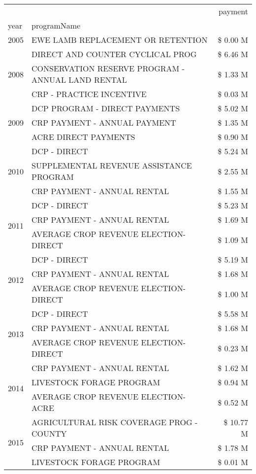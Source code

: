 \begin{tabular}{llr}
\toprule
 &  & payment \\
year & programName &  \\
\midrule
2005 & EWE LAMB REPLACEMENT OR RETENTION & \$ 0.00 M \\
\cline{1-3}
\multirow[t]{3}{*}{2008} & DIRECT AND COUNTER CYCLICAL PROG & \$ 6.46 M \\
 & CONSERVATION RESERVE PROGRAM - ANNUAL LAND RENTAL & \$ 1.33 M \\
 & CRP - PRACTICE INCENTIVE & \$ 0.03 M \\
\cline{1-3}
\multirow[t]{3}{*}{2009} & DCP PROGRAM - DIRECT PAYMENTS & \$ 5.02 M \\
 & CRP PAYMENT - ANNUAL PAYMENT & \$ 1.35 M \\
 & ACRE DIRECT PAYMENTS & \$ 0.90 M \\
\cline{1-3}
\multirow[t]{3}{*}{2010} & DCP - DIRECT & \$ 5.24 M \\
 & SUPPLEMENTAL REVENUE ASSISTANCE PROGRAM & \$ 2.55 M \\
 & CRP PAYMENT - ANNUAL RENTAL & \$ 1.55 M \\
\cline{1-3}
\multirow[t]{3}{*}{2011} & DCP - DIRECT & \$ 5.23 M \\
 & CRP PAYMENT - ANNUAL RENTAL & \$ 1.69 M \\
 & AVERAGE CROP REVENUE ELECTION-DIRECT & \$ 1.09 M \\
\cline{1-3}
\multirow[t]{3}{*}{2012} & DCP - DIRECT & \$ 5.19 M \\
 & CRP PAYMENT - ANNUAL RENTAL & \$ 1.68 M \\
 & AVERAGE CROP REVENUE ELECTION-DIRECT & \$ 1.00 M \\
\cline{1-3}
\multirow[t]{3}{*}{2013} & DCP - DIRECT & \$ 5.58 M \\
 & CRP PAYMENT - ANNUAL RENTAL & \$ 1.68 M \\
 & AVERAGE CROP REVENUE ELECTION-DIRECT & \$ 0.23 M \\
\cline{1-3}
\multirow[t]{3}{*}{2014} & CRP PAYMENT - ANNUAL RENTAL & \$ 1.62 M \\
 & LIVESTOCK FORAGE PROGRAM & \$ 0.94 M \\
 & AVERAGE CROP REVENUE ELECTION-ACRE & \$ 0.52 M \\
\cline{1-3}
\multirow[t]{3}{*}{2015} & AGRICULTURAL RISK COVERAGE PROG - COUNTY & \$ 10.77 M \\
 & CRP PAYMENT - ANNUAL RENTAL & \$ 1.78 M \\
 & LIVESTOCK FORAGE PROGRAM & \$ 0.01 M \\

\end{tabular}
